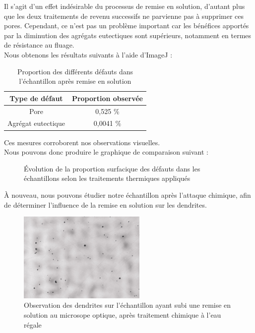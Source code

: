 Il s'agit d'un effet indésirable du processus de remise en solution, d'autant plus que 
les deux traitements de revenu successifs ne parvienne pas à supprimer ces pores. 
Cependant, ce n'est pas un problème important car les bénéfices apportés par la diminution des 
agrégats eutectiques sont supérieurs, notamment en termes de résistance au fluage. \\


Nous obtenons les résultats suivants à l'aide d'ImageJ :\\

\begin{table}[H]
    \centering
    \caption{Proportion des différents défauts dans l'échantillon après remise en solution}
    \begin{tabular}{|c|c|}
        \hline
        \textbf{Type de défaut}  & \textbf{Proportion observée}  \\
        \hline
        Pore               & 0,525  \% \\
        Agrégat eutectique & 0,0041 \% \\
        \hline
    \end{tabular}
    \label{fig:proportion_defauts_RES}
\end{table}

Ces mesures corroborent nos observations visuelles.\\


Nous pouvons donc produire le graphique de comparaison suivant :


\begin{figure}[H]
    \centering
    
    \caption{Évolution de la proportion surfacique des défauts dans les 
    échantillons selon les traitements thermiques appliqués\\}
    \label{fig:evolution_proportion_defauts_brut_RES}
\end{figure}


À nouveau, nous pouvons étudier notre échantillon après l'attaque chimique, 
afin de déterminer l'influence de la remise en solution sur les dendrites.\\


\begin{figure}[H]
    \centering
    \includegraphics[width = 0.55\textwidth]{images_optique/res_dendrites.pdf}
    \caption{Observation des dendrites sur l'échantillon ayant subi une remise en solution
    au microsope optique, après traitement chimique à l'eau régale\\}
    \label{fig:RES_dendrites_optique}
\end{figure}


